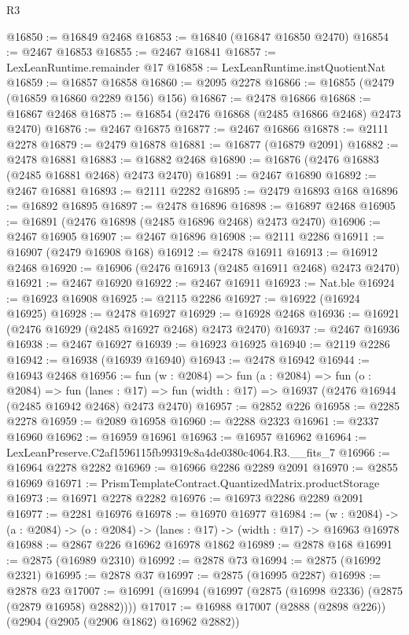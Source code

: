 \begin{lexlean}{R3}
\begin{coremodule}
@16850 := @16849 @2468
@16853 := @16840 (@16847 @16850 @2470)
@16854 := @2467 @16853
@16855 := @2467 @16841
@16857 := LexLeanRuntime.remainder @17
@16858 := LexLeanRuntime.instQuotientNat
@16859 := @16857 @16858
@16860 := @2095 @2278
@16866 := @16855 (@2479 (@16859 @16860 @2289 @156) @156)
@16867 := @2478 @16866
@16868 := @16867 @2468
@16875 := @16854 (@2476 @16868 (@2485 @16866 @2468) @2473 @2470)
@16876 := @2467 @16875
@16877 := @2467 @16866
@16878 := @2111 @2278
@16879 := @2479 @16878
@16881 := @16877 (@16879 @2091)
@16882 := @2478 @16881
@16883 := @16882 @2468
@16890 := @16876 (@2476 @16883 (@2485 @16881 @2468) @2473 @2470)
@16891 := @2467 @16890
@16892 := @2467 @16881
@16893 := @2111 @2282
@16895 := @2479 @16893 @168
@16896 := @16892 @16895
@16897 := @2478 @16896
@16898 := @16897 @2468
@16905 := @16891 (@2476 @16898 (@2485 @16896 @2468) @2473 @2470)
@16906 := @2467 @16905
@16907 := @2467 @16896
@16908 := @2111 @2286
@16911 := @16907 (@2479 @16908 @168)
@16912 := @2478 @16911
@16913 := @16912 @2468
@16920 := @16906 (@2476 @16913 (@2485 @16911 @2468) @2473 @2470)
@16921 := @2467 @16920
@16922 := @2467 @16911
@16923 := Nat.ble
@16924 := @16923 @16908
@16925 := @2115 @2286
@16927 := @16922 (@16924 @16925)
@16928 := @2478 @16927
@16929 := @16928 @2468
@16936 := @16921 (@2476 @16929 (@2485 @16927 @2468) @2473 @2470)
@16937 := @2467 @16936
@16938 := @2467 @16927
@16939 := @16923 @16925
@16940 := @2119 @2286
@16942 := @16938 (@16939 @16940)
@16943 := @2478 @16942
@16944 := @16943 @2468
@16956 := fun (w : @2084) =>
  fun (a : @2084) =>
  fun (o : @2084) =>
  fun (lanes : @17) => fun (width : @17) => @16937 (@2476 @16944 (@2485 @16942 @2468) @2473 @2470)
@16957 := @2852 @226
@16958 := @2285 @2278
@16959 := @2089 @16958
@16960 := @2288 @2323
@16961 := @2337 @16960
@16962 := @16959 @16961
@16963 := @16957 @16962
@16964 := LexLeanPreserve.C2af1596115fb99319c8a4de0380c4064.R3.__fits_7
@16966 := @16964 @2278 @2282
@16969 := @16966 @2286 @2289 @2091
@16970 := @2855 @16969
@16971 := PrismTemplateContract.QuantizedMatrix.productStorage
@16973 := @16971 @2278 @2282
@16976 := @16973 @2286 @2289 @2091
@16977 := @2281 @16976
@16978 := @16970 @16977
@16984 := (w : @2084) ->
  (a : @2084) -> (o : @2084) -> (lanes : @17) -> (width : @17) -> @16963 @16978
@16988 := @2867 @226 @16962 @16978 @1862
@16989 := @2878 @168
@16991 := @2875 (@16989 @2310)
@16992 := @2878 @73
@16994 := @2875 (@16992 @2321)
@16995 := @2878 @37
@16997 := @2875 (@16995 @2287)
@16998 := @2878 @23
@17007 := @16991 (@16994 (@16997 (@2875 (@16998 @2336) (@2875 (@2879 @16958) @2882))))
@17017 := @16988 @17007 (@2888 (@2898 @226)) (@2904 (@2905 (@2906 @1862) @16962 @2882))

\end{coremodule}
\end{lexlean}
